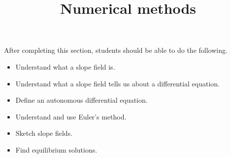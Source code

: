\documentclass{ximera}
\title{Numerical methods}
\begin{document}
\begin{abstract}
\end{abstract}

\maketitle

\begin{sectionOutcomes}

After completing this section, students should be able to do the following.

\begin{itemize}
\item Understand what a slope field is.
\item Understand what a slope field tells us about a differential equation.
\item Define an autonomous differential equation.
\item Understand and use Euler's method.
\item Sketch slope fields.
\item Find equilibrium solutions.
\end{itemize}

\end{sectionOutcomes}
\end{document}
